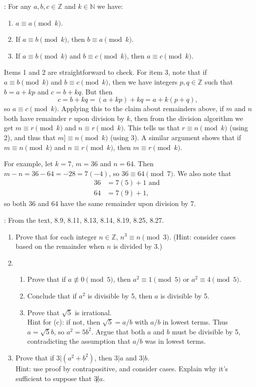 \documentclass[letterpaper,12pt]{article}
\newcommand{\N}{\mathbb{N}}
\newcommand{\Z}{\mathbb{Z}}
\newcommand{\modd}[3]{#1\equiv #2 \pmod{#3}}
\begin{document}
: For any $a,b,c\in \Z$ and $k\in\N$ we have:
\begin{enumerate}
 \item $\modd{a}{a}{k}$.
 \item If $\modd{a}{b}{k}$, then $\modd{b}{a}{k}$.
 \item If $\modd{a}{b}{k}$ and $\modd{b}{c}{k}$, then $\modd{a}{c}{k}$.
\end{enumerate}
Items 1 and 2 are straightforward to check. For item 3, note that if $\modd{a}{b}{k}$ and $\modd{b}{c}{k}$, then we have integers $p,q\in\Z$ such that $b=a+kp$ and $c = b+kq$. But then
\[
 c = b+kq = (a+kp)+kq = a + k(p+q),
\]
so $\modd{a}{c}{k}$. Applying this to the claim about remainders above, if $m$ and $n$ both have remainder $r$ upon division by $k$, then from the division algorithm we get $\modd{m}{r}{k}$ and $\modd{n}{r}{k}$. This tells us that $\modd{r}{n}{k}$ (using 2), and thus that $\modd{m]}{n}{k}$ (using 3). A similar argument shows that if $\modd{m}{n}{k}$ and $\modd{n}{r}{k}$, then $\modd{m}{r}{k}$.

For example, let $k=7$, $m=36$ and $n=64$. Then $m-n = 36-64 = -28 = 7(-4)$, so $\modd{36}{64}{7}$. We also note that
\begin{align*}
 36 & = 7(5)+1 \text{ and }\\
 64 & = 7(9)+1,
\end{align*}
so both 36 and 64 have the same remainder upon division by 7.

: From the text, 8.9, 8.11, 8.13, 8.14, 8.19, 8.25, 8.27.
\begin{enumerate}
 \item Prove that for each integer $n\in\Z$, $\modd{n^3}{n}{3}$. (Hint: consider cases based on the remainder when $n$ is divided by 3.)
 \item \begin{enumerate}
        \item Prove that if $a\not\equiv 0 \pmod{5}$, then $\modd{a^2}{1}{5}$ or $\modd{a^2}{4}{5}$.
        \item Conclude that if $a^2$ is divisible by 5, then $a$ is divisible by 5.
        \item Prove that $\sqrt{5}$ is irrational.\\
Hint for (c): if not, then $\sqrt{5}=a/b$ with $a/b$ in lowest terms. Thus $a=\sqrt{5}b$, so $a^2=5b^2$. Argue that both $a$ and $b$ must be divisible by 5, contradicting the assumption that $a/b$ was in lowest terms.
       \end{enumerate}
 \item Prove that if $3|(a^2+b^2)$, then $3|a$ and $3|b$.\\
Hint: use proof by contrapositive, and consider cases. Explain why it's sufficient to suppose that $3\not|a$.

\end{enumerate}
\end{document}
